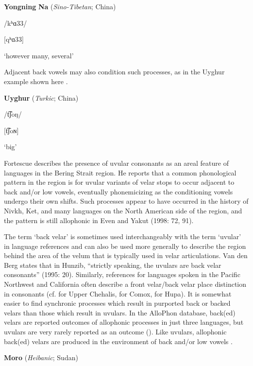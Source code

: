 \ea\label{ex:(4.39)}
  \textbf{Yongning} \textbf{Na} (\textit{Sino-Tibetan}; China)

/kʰɑ33/

[qʰɑ33]

\glt ‘however many, several’

\citep[80]{Lidz2010}

\z

Adjacent back vowels may also condition such processes, as in the Uyghur example shown here .

\ea\label{ex:(4.40)}
  \textbf{Uyghur} (\textit{Turkic}; China)

/t͡ʃoŋ/

[t͡ʃoɴ]

\glt ‘big’

\citep[76]{Hahn1991}

\z

  Fortescue describes the presence of uvular consonants as an areal feature of languages in the Bering Strait region. He reports that a common phonological pattern in the region is for uvular variants of velar stops to occur adjacent to back and/or low vowels, eventually phonemicizing as the conditioning vowels undergo their own shifts. Such processes appear to have occurred in the history of Nivkh, Ket, and many languages on the North American side of the region, and the pattern is still allophonic in Even and Yakut (1998: 72, 91).

  The term ‘back velar’ is sometimes used interchangeably with the term ‘uvular’ in language references and can also be used more generally to describe the region behind the area of the velum that is typically used in velar articulations. Van den Berg states that in Hunzib, “strictly speaking, the uvulars are back velar consonants” (1995: 20). Similarly, references for languages spoken in the Pacific Northwest and California often describe a front velar/back velar place distinction in consonants (cf. \citealt{Kinkade1963} for Upper Chehalis, \citealt{Harris1981} for Comox, \citealt{Golla1970} for Hupa). It is somewhat easier to find synchronic processes which result in purported back or backed velars than those which result in uvulars. In the AlloPhon database, back(ed) velars are reported outcomes of allophonic processes in just three languages, but uvulars are very rarely reported as an outcome (\citealt{BybeeEasterday2019}). Like uvulars, allophonic back(ed) velars are produced in the environment of back and/or low vowels .

\ea\label{ex:(4.41)}
  \textbf{Moro} (\textit{Heibanic}; Sudan)

